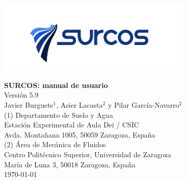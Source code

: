 \documentclass[11pt, twoside, openany, a4paper]{book}
\begin{document}

\nocite{*}

\renewcommand{\tablename}{Tabla}
\renewcommand{\listtablename}{Índice de tablas}
\renewcommand{\bibname}{Bibliografía}

\pagestyle{empty}

\begin{titlepage} 
\begin{center} 
 
\includegraphics*[height=3.5cm]{images/logo_surcos.png} 

\vspace*{3.5cm} 
{\Huge \textbf{SURCOS: manual de usuario\\}}
\vspace*{1cm} 
{\normalsize Versión 5.9}\\
\vspace*{1cm} 
{\Large Javier Burguete$^1$, Asier Lacasta$^2$ y Pilar García-Navarro$^2$}\\ 
\vspace*{2.5cm} 
{\normalsize (1) Departamento de Suelo y Agua}\\
{Estación Experimental de Aula Dei / CSIC}\\ 
{Avda. Montañana 1005, 50059 Zaragoza, España}\\ 
\vspace*{1cm} 
{\normalsize (2) Área de Mecánica de Fluidos}\\ 
{Centro Politécnico Superior, Universidad de Zaragoza}\\
{María de Luna 3, 50018 Zaragoza, España}\\
\vspace*{1cm} 
{\normalsize \today}\\ 
\end{center} 
\end{titlepage} 
\cleardoublepage

\pagestyle{plain}

\tableofcontents
\listoffigures

\cleardoublepage

\pagestyle{headings}


\cleardoublepage


\cleardoublepage


\cleardoublepage

%
\end{document}
